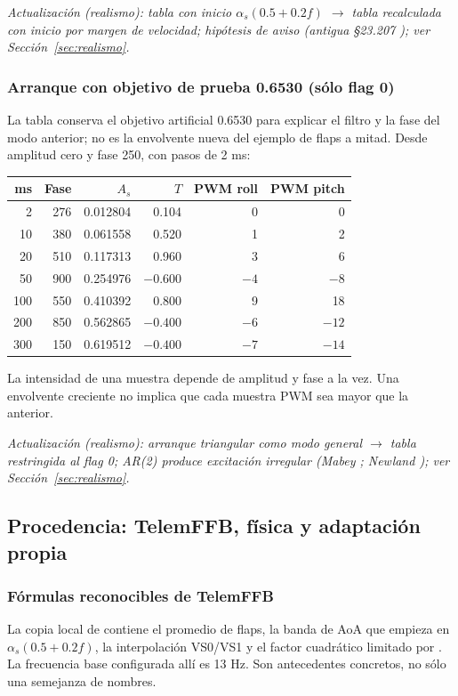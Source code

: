 \textit{Actualización (realismo): tabla con inicio $\alpha_s(0.5+0.2f)$ $\rightarrow$ tabla recalculada con inicio por margen de velocidad; hipótesis de aviso (antigua §23.207 \cite{cfr23}); ver Sección~\ref{sec:realismo}.}

\subsubsection{Arranque con objetivo de prueba 0.6530 (sólo flag 0)}
La tabla conserva el objetivo artificial 0.6530 para explicar el filtro y la fase del modo anterior; no es la envolvente nueva del ejemplo de flaps a mitad.
Desde amplitud cero y fase 250, con pasos de 2 ms:
\begin{center}\begin{tabular}{rrrrrr}
\toprule ms&Fase&$A_s$&$T$&PWM roll&PWM pitch\\\midrule
2&276&0.012804&0.104&0&0\\
10&380&0.061558&0.520&1&2\\
20&510&0.117313&0.960&3&6\\
50&900&0.254976&$-0.600$&$-4$&$-8$\\
100&550&0.410392&0.800&9&18\\
200&850&0.562865&$-0.400$&$-6$&$-12$\\
300&150&0.619512&$-0.400$&$-7$&$-14$\\\bottomrule
\end{tabular}\end{center}
La intensidad de una muestra depende de amplitud y fase a la vez. Una envolvente creciente no implica que cada muestra PWM sea mayor que la anterior.

\textit{Actualización (realismo): arranque triangular como modo general $\rightarrow$ tabla restringida al flag 0; AR(2) produce excitación irregular (Mabey \cite{mabey1988}; Newland \cite{newland1993}); ver Sección~\ref{sec:realismo}.}

\subsection{Procedencia: TelemFFB, física y adaptación propia}
\subsubsection{Fórmulas reconocibles de TelemFFB}
La copia local de  contiene el promedio de flaps, la banda de AoA que empieza en $\alpha_s(0.5+0.2f)$, la interpolación VS0/VS1 y el factor cuadrático limitado por . La frecuencia base configurada allí es 13 Hz. Son antecedentes concretos, no sólo una semejanza de nombres.

